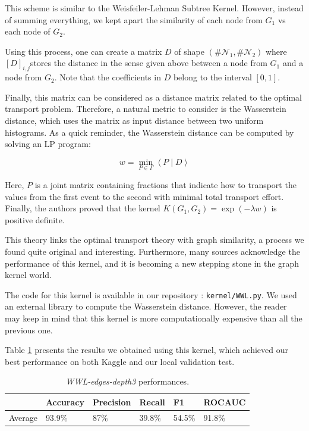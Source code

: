 \documentclass{IEEEtran}
\begin{document}
This scheme is similar to the Weisfeiler-Lehman Subtree Kernel. However, instead of summing everything, we kept apart the similarity of each node from $G_1$ vs each node of $G_2$.

Using this process, one can create a matrix $D$ of shape
$(\# \mathcal{N}_1, \# \mathcal{N}_2)$
where $[D]_{i,j}$stores the distance in the sense given above between a node from $G_1$ and a node from $G_2$. Note that the coefficients in $D$ belong to the interval $[0,1]$.

Finally, this matrix can be considered as a distance matrix related to the optimal transport problem. Therefore, a natural metric to consider is the Wasserstein distance, which uses the matrix as input distance between two uniform histograms. As a quick reminder, the Wasserstein distance can be computed by solving an LP program:

\begin{equation*}
    w = \underset{P \in \Gamma}{\operatorname*{min}} \left< P \; | \; D \right>
\end{equation*}

Here, $P$ is a joint matrix containing fractions that indicate how to transport the values from the first event to the second with minimal total transport effort. Finally, the authors proved that the kernel $K(G_1,G_2) = \exp(-\lambda w)$ is positive definite.

This theory links the optimal transport theory with graph similarity, a process we found quite original and interesting. Furthermore, many sources acknowledge the performance of this kernel, and it is becoming a new stepping stone in the graph kernel world.

The code for this kernel is available in our repository : \texttt{kernel/WWL.py}.
We used an external library to compute the Wasserstein distance.
However, the reader may keep in mind that this kernel is more
computationally expensive than all the previous one.

Table \ref{tab:wwl} presents the results we obtained using this kernel, which achieved our best performance on both Kaggle and our local validation test.

\begin{table}[h]
    \centering
    \begin{tabular}{l|llll|l}
                & Accuracy & Precision & Recall & F1     & ROCAUC \\
        \hline
        Average & 93.9\%   & 87\%      & 39.8\% & 54.5\% & 91.8\% \\
    \end{tabular}
    \caption{\emph{WWL-edges-depth3} performances.}
    \label{tab:wwl}
\end{table}
\end{document}
